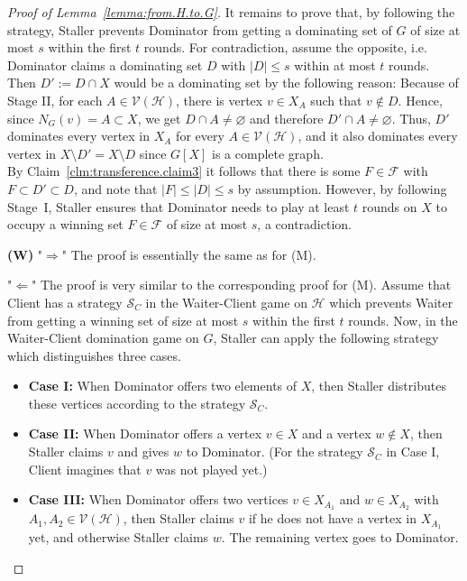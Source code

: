 \documentclass[10pt,a4paper]{amsart}
\newcommand{\calF}{\mathcal{F}}
\newcommand{\calH}{\mathcal{H}}
\newcommand{\calV}{\mathcal{V}}
\begin{document}
\begin{proof}[Proof of Lemma~\ref{lemma:from.H.to.G}]
It remains to prove that, by following the strategy, Staller 
prevents Dominator from getting a dominating set of $G$ 
of size at most $s$ within
the first $t$ rounds.
For contradiction, assume the opposite, i.e. 
Dominator claims a dominating set $D$ with $|D|\leq s$ within at most $t$ rounds.
Then $D' := D\cap X$ would be a dominating set by the following reason:
Because of Stage II, for each $A\in \mathcal{V}(\calH)$,
there is vertex $v\in X_A$ such that $v\notin D$.
Hence, since $N_G(v)=A\subset X$, 
we get $D\cap A \neq \varnothing$
and therefore $D'\cap A \neq \varnothing$. 
Thus, $D'$ dominates every vertex in $X_A$ for every $A\in \mathcal{V}(\calH)$,
and it also dominates every vertex in $X\setminus D' = X\setminus D$
since $G[X]$ is a complete graph. \\
By Claim~\ref{clm:transference.claim3}
it follows that there is some $F\in \calF$ with 
$F\subset D'\subset D$,
and note that $|F|\leq |D|\leq s$ by assumption. 
However, by following Stage~I, Staller ensures that Dominator needs to play at least $t$ rounds
on $X$ to occupy a winning set $F\in \calF$
of size at most $s$, a contradiction.

\medskip


\textbf{(W)} "$\Rightarrow$" The proof is essentially the same as for (M).

"$\Leftarrow$" The proof is very similar to the corresponding proof for (M).
Assume that Client has a strategy $\mathcal{S}_C$ in the 
Waiter-Client game on $\calH$ which prevents Waiter from 
getting a winning set of size at most $s$ 
within the first $t$ rounds. 
Now, in the Waiter-Client domination game on $G$,
Staller can apply the following strategy which distinguishes
three cases.
\begin{itemize}
\item[] \textbf{Case I:} When Dominator offers two elements of $X$,
then Staller distributes these vertices according to the strategy $\mathcal{S}_C$.
\item[] \textbf{Case II:} When Dominator offers a vertex $v\in X$ and a vertex $w \notin X$, then Staller claims $v$ and gives $w$ to 
Dominator. (For the strategy $\mathcal{S}_C$ in Case I, Client imagines that $v$ was not played yet.)
\item[] \textbf{Case III:} When Dominator offers two vertices 
$v\in X_{A_1}$ and $w\in X_{A_2}$ with $A_1,A_2\in \calV(\calH)$,
then Staller claims $v$ if he does not have a vertex in $X_{A_1}$ yet, and otherwise Staller claims $w$. The remaining vertex goes to Dominator.
\end{itemize}


\end{proof}
\end{document}

